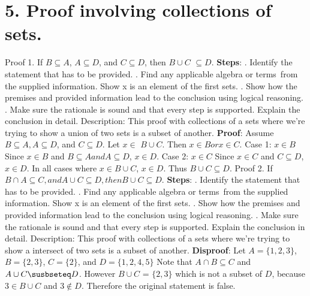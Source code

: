 \documentclass{article}
\begin{document}
\section*{5. Proof involving collections of sets.}
Proof 1. If \(B \subseteq A\), \(A \subseteq D\), and \(C \subseteq D\), then \(B \cup C\) \(\subseteq D\).
\newline \textbf{Steps}: . Identify the statement that has to be provided.
. Find any applicable algebra or terms from the supplied information. Show x is an element of the first sets.
. Show how the premises and provided information lead to the conclusion using logical reasoning.
. Make sure the rationale is sound and that every step is supported.
Explain the conclusion in detail.
\newline Description: This proof with collections of a sets where we're trying to show a union of two sets is a subset of another.
\newline
\textbf{Proof}: Assume \(B \subseteq A, A \subseteq D\), and \(C \subseteq D\).
\newline
Let \(x \in \) \(B \cup C\).
\newline
Then \(x \in B or x \in C\).
\newline
Case 1: \(x \in B\)
\newline
Since \(x \in B\) and \(B \subseteq A and A \subseteq D\), \(x \in D\).
\newline
Case 2: \( x \in C\)
\newline
Since \(x \in C\) and \(C \subseteq D\), \(x \in D\).
\newline
In all cases where \(x \in B \cup C\), \(x \in D\). Thus \(B \cup C \subseteq D\).
\newline
\newline
Proof 2. If \(B \cap A \subseteq C, and A \cup C \subseteq D, then B \cup C \subseteq D\).
\newline \textbf{Steps}: . Identify the statement that has to be provided.
. Find any applicable algebra or terms from the supplied information. Show x is an element of the first sets.
. Show how the premises and provided information lead to the conclusion using logical reasoning.
. Make sure the rationale is sound and that every step is supported.
Explain the conclusion in detail.
\newline Description: This proof with collections of a sets where we're trying to show a intersect of two sets is a subset of another.
\newline
\textbf{Disproof}: Let \(A = \{1, 2 ,3\}\),\(B = \{2, 3\}\), \(C = \{2\}\), and \(D = \{1, 2, 4, 5\}\)
\newline
Note that $A \cap B \subseteq C$ and $A \cup C \susbseteq D$.
\newline
However $B \cup C$ = $\{2, 3\}$ which is not a subset of $D$, because $3 \in B \cup C$ and $3 \notin D$.
\newline
Therefore the original statement is false.
\end{document}
